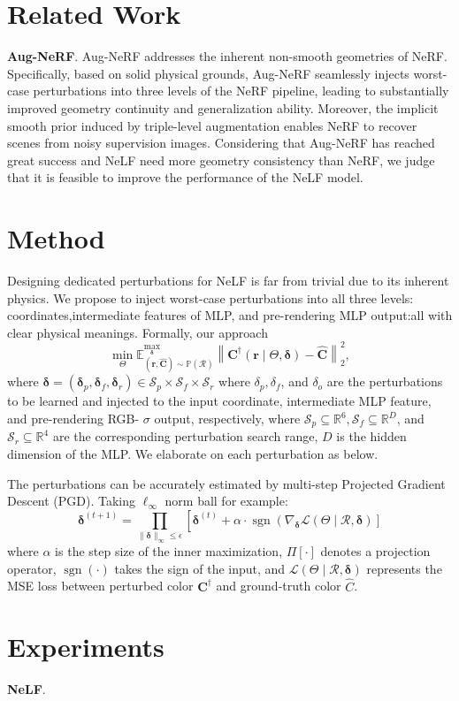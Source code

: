 \documentclass[10pt,twocolumn,letterpaper]{article}
\begin{document}
\section{Related Work}
\label{sec:formatting}
\textbf{Aug-NeRF}. Aug-NeRF addresses the inherent non-smooth geometries of NeRF. Specifically, based on solid physical grounds, Aug-NeRF seamlessly injects worst-case perturbations into three levels of the NeRF pipeline, leading to substantially improved geometry continuity and generalization ability. Moreover, the implicit smooth prior induced by triple-level augmentation enables NeRF to recover scenes from noisy supervision images. Considering that Aug-NeRF has reached great success and NeLF need more geometry consistency than NeRF, we judge that it is feasible to improve the performance of the NeLF model.

\section{Method}
Designing dedicated perturbations for NeLF is far from trivial due to its inherent physics. We propose to inject worst-case perturbations into all three levels:  coordinates,intermediate features of MLP, and pre-rendering MLP output:all with clear physical meanings.  Formally, our approach
$$
\min _{\Theta} \mathbb{E}_{(\boldsymbol{r}, \widehat{\boldsymbol{C}}) \sim \mathbb{P}(\mathcal{R})}^{\max _{\boldsymbol{\delta}}}\left\|\boldsymbol{C}^{\dagger}(\boldsymbol{r} \mid \Theta, \boldsymbol{\delta})-\widehat{\boldsymbol{C}}\right\|_2^2,
$$
where $\boldsymbol{\delta}=\left(\boldsymbol{\delta}_p, \boldsymbol{\delta}_f, \boldsymbol{\delta}_r\right) \in \mathcal{S}_p \times \mathcal{S}_f \times \mathcal{S}_r$
where $\delta_p, \delta_f$, and $\delta_o$ are the perturbations to be learned and injected to the input coordinate, intermediate MLP feature, and pre-rendering RGB- $\sigma$ output, respectively, where $\mathcal{S}_p \subseteq \mathbb{R}^6, \mathcal{S}_f \subseteq \mathbb{R}^D$, and $\mathcal{S}_r \subseteq \mathbb{R}^4$ are the corresponding perturbation search range, $D$ is the hidden dimension of the MLP. We elaborate on each perturbation as below.

The perturbations can be accurately estimated by multi-step Projected Gradient Descent (PGD). Taking $\ell_{\infty}$ norm ball for example:
$$
\boldsymbol{\delta}^{(t+1)}=\prod_{\|\boldsymbol{\delta}\|_{\infty} \leq \epsilon}\left[\boldsymbol{\delta}^{(t)}+\alpha \cdot \operatorname{sgn}\left(\nabla_{\boldsymbol{\delta}} \mathcal{L}(\Theta \mid \mathcal{R}, \boldsymbol{\delta})\right]\right.
$$
where $\alpha$ is the step size of the inner maximization, $\Pi[\cdot]$ denotes a projection operator, $\operatorname{sgn}(\cdot)$ takes the sign of the input, and $\mathcal{L}(\Theta \mid \mathcal{R}, \boldsymbol{\delta})$ represents the MSE loss between perturbed color $\boldsymbol{C}^{\dagger}$ and ground-truth color $\widehat{C}$.
\section{Experiments}
\label{sec:formatting}
\textbf{NeLF}.
{\small


}
\end{document}
